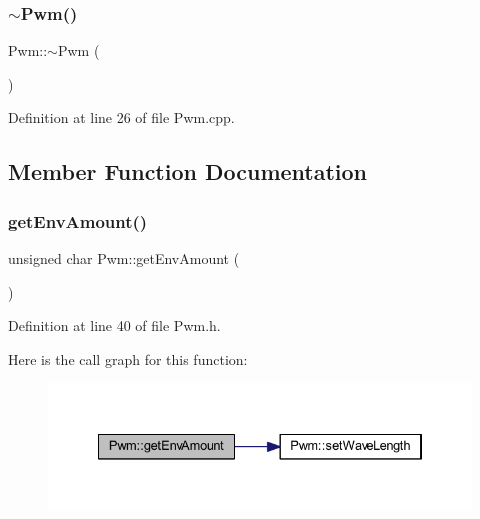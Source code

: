 \subsubsection{\texorpdfstring{$\sim$\+Pwm()}{~Pwm()}}
{\footnotesize\ttfamily Pwm\+::$\sim$\+Pwm (\begin{DoxyParamCaption}{ }\end{DoxyParamCaption})}



Definition at line 26 of file Pwm.\+cpp.



\subsection{Member Function Documentation}
\mbox{\label{class_pwm_ada7e7bc3b17ee5fe5fb7af5379486e8e}} 
\subsubsection{\texorpdfstring{get\+Env\+Amount()}{getEnvAmount()}}
{\footnotesize\ttfamily unsigned char Pwm\+::get\+Env\+Amount (\begin{DoxyParamCaption}{ }\end{DoxyParamCaption})\hspace{0.3cm}{\ttfamily [inline]}}



Definition at line 40 of file Pwm.\+h.

Here is the call graph for this function\+:
\nopagebreak
\begin{figure}[H]
\begin{center}
\leavevmode
\includegraphics[width=334pt]{d6/df6/class_pwm_ada7e7bc3b17ee5fe5fb7af5379486e8e_cgraph}
\end{center}
\end{figure}
\mbox{\label{class_pwm_a7b41dfa02ff30f6260b81c75627ed333}} 
